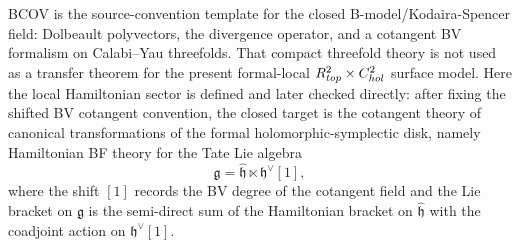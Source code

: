 \documentclass[11pt]{memoir}
\begin{document}
BCOV \cite{bcov} is the source-convention template for the closed
B-model/Kodaira-Spencer field: Dolbeault polyvectors, the divergence
operator, and a cotangent BV formalism on Calabi--Yau threefolds.  That
compact threefold theory is not used as a transfer theorem for the present
formal-local \(R^2_{top}\times C^2_{hol}\) surface model.
Here the local Hamiltonian sector is defined and later checked directly:
after fixing the shifted BV cotangent convention, the closed target is
the cotangent theory of canonical transformations of the formal
holomorphic-symplectic disk, namely Hamiltonian BF theory for the Tate
Lie algebra
\begin{equation}\label{eq:cotangent-Lie-algebra}
\mathfrak g=\widehat{\mathfrak h}\ltimes\mathfrak h^\vee[1],
\end{equation}
where the shift $[1]$ records the BV degree of the cotangent field and the
Lie bracket on $\mathfrak g$ is the semi-direct sum of the Hamiltonian
bracket on $\widehat{\mathfrak h}$ with the coadjoint action on
$\mathfrak h^\vee[1]$.
\end{document}
